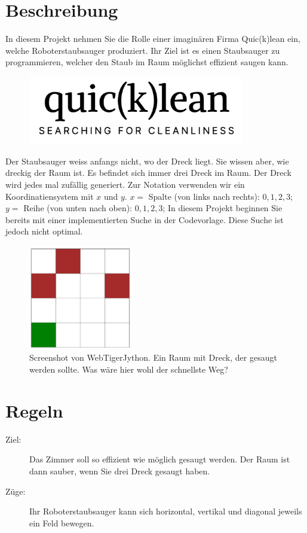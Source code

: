 \documentclass[a4paper,11pt,german,notitlepage]{report}
\begin{document}
\section*{Beschreibung}
In diesem Projekt nehmen Sie die Rolle einer imaginären Firma Quic(k)lean ein, welche Roboterstaubsauger produziert.
Ihr Ziel ist es einen Staubsauger zu programmieren, welcher den Staub im Raum möglichst effizient saugen kann.
\begin{figure}[h!]
    \centering
    \includegraphics[height=3cm]{logo.png}  
\end{figure}
Der Staubsauger weiss anfangs nicht, wo der Dreck liegt.
Sie wissen aber, wie dreckig der Raum ist.
Es befindet sich immer drei Dreck im Raum.
Der Dreck wird jedes mal zufällig generiert.
Zur Notation verwenden wir ein Koordinatiensystem mit $x$ und $y$.
$x =$ Spalte (von links nach rechts): $0, 1, 2, 3$;
$y =$ Reihe (von unten nach oben): $0, 1, 2, 3$;
In diesem Projekt beginnen Sie bereits mit einer implementierten Suche in der Codevorlage.
Diese Suche ist jedoch nicht optimal.
\begin{figure}[h!]
    \centering
    \includegraphics[width=4.5cm]{staubsauger.png}    
    \caption{Screenshot von WebTigerJython. Ein Raum mit Dreck, der gesaugt werden sollte. Was wäre hier wohl der schnellste Weg?}
\end{figure}
\section*{Regeln}
\begin{description}
    \item[Ziel:] Das Zimmer soll so effizient wie möglich gesaugt werden. Der Raum ist dann sauber, wenn Sie drei Dreck gesaugt haben.
    \item[Züge:] Ihr Roboterstaubsauger kann sich horizontal, vertikal und diagonal jeweils ein Feld bewegen.
\end{description}
\end{document}
